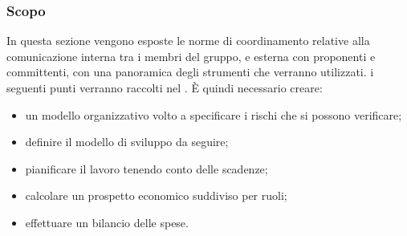 \subsubsection{Scopo} In questa sezione vengono esposte le norme di coordinamento relative alla comunicazione interna tra i membri del gruppo, e esterna con proponenti e committenti, con una panoramica degli strumenti che verranno utilizzati. i seguenti punti verranno raccolti nel \PdPv{}. È quindi necessario creare:
\begin{itemize}
	\item{un modello organizzativo volto a specificare i rischi che si possono verificare;}
	\item{definire il modello di sviluppo da seguire;}
	\item{pianificare il lavoro tenendo conto delle scadenze;}
	\item{calcolare un prospetto economico suddiviso per ruoli;}
	\item{effettuare un bilancio delle spese.}
\end{itemize}